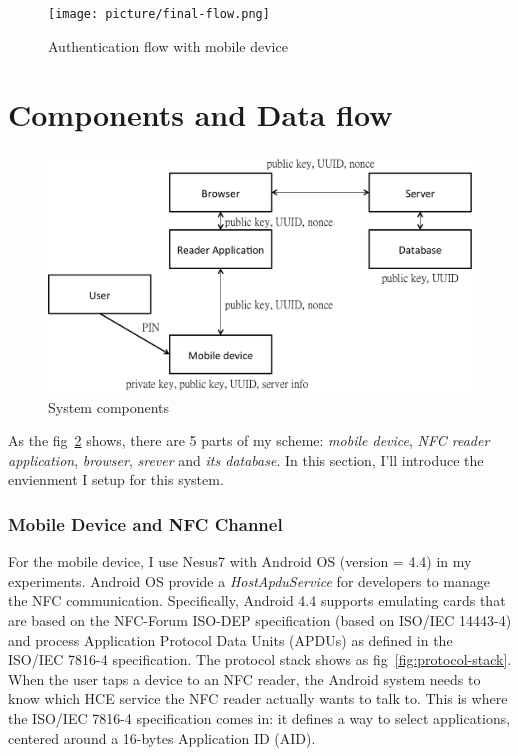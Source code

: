 \begin{CJK}{Bg5}{bsmi}
\begin{figure}
\centering
\texttt{[image: picture/final-flow.png]}
\caption{Authentication flow with mobile device}
\label{fig:final-flow}
\end{figure}

\section{Components and Data flow}

\begin{figure}
\centering
\includegraphics[scale=0.45]{picture/system-component.png}
\caption{System components}
\label{fig:system-component}
\end{figure}

As the fig~\ref{fig:system-component} shows, there are 5 parts of my scheme: \emph{mobile device}, \emph{NFC reader application}, \emph{browser}, \emph{srever} and \emph{its database}. In this section, I'll introduce the envienment I setup for this system.

\subsubsection{Mobile Device and NFC Channel}

For the mobile device, I use Nesus7 with Android OS (version = 4.4) in my experiments. Android OS provide a \emph{HostApduService} for developers to manage the NFC communication. Specifically, Android 4.4 supports emulating cards that are based on the NFC-Forum ISO-DEP specification (based on ISO/IEC 14443-4) and process Application Protocol Data Units (APDUs) as defined in the ISO/IEC 7816-4 specification. The protocol stack shows as fig~\ref{fig:protocol-stack}. When the user taps a device to an NFC reader, the Android system needs to know which HCE service the NFC reader actually wants to talk to. This is where the ISO/IEC 7816-4 specification comes in: it defines a way to select applications, centered around a 16-bytes Application ID (AID).


\end{CJK}
